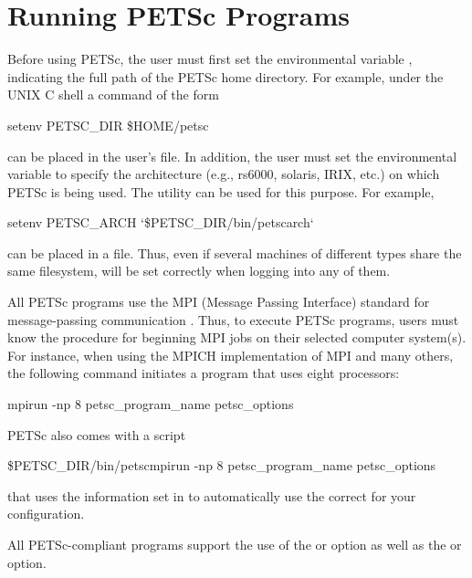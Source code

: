 \section{Running PETSc Programs}
\label{sec_running}

Before using PETSc, the user must first set the environmental variable
,  indicating the full path of the PETSc home
directory.  For example, under the UNIX C shell a command of the form
\begin{tabbing}
   setenv PETSC\_DIR \$HOME/petsc
\end{tabbing}
 can be placed in the user's  file.  In addition, the user must set the environmental
variable {} to specify the architecture (e.g., rs6000,
solaris, IRIX, etc.)  on which PETSc is being used.  The utility
  can be used for this purpose.  For example,
\begin{tabbing}
   setenv PETSC\_ARCH `\$PETSC\_DIR/bin/petscarch`
\end{tabbing}
can be placed in a  file.  Thus, even if several machines of different
types share the same filesystem,  will be set correctly
when logging into any of them. 

All PETSc programs use the MPI (Message Passing Interface) standard
for message-passing communication \cite{MPI-final}.  Thus, to execute
PETSc programs, users must know the procedure for beginning MPI jobs
on their selected computer system(s).  For instance, when using the
MPICH implementation of MPI \cite{mpich-web-page} and many others, the following
command initiates a program that uses eight processors:
  
\begin{tabbing}
   mpirun -np 8 petsc\_program\_name petsc\_options
\end{tabbing}

PETSc also comes with a script 
\begin{tabbing}
   \${PETSC\_DIR}/bin/petscmpirun -np 8 petsc\_program\_name petsc\_options
\end{tabbing}
that uses the information set in  to 
automatically use the correct  for your configuration.

All PETSc-compliant programs support the use of the 
 or  option as well as the  
or  option. 


